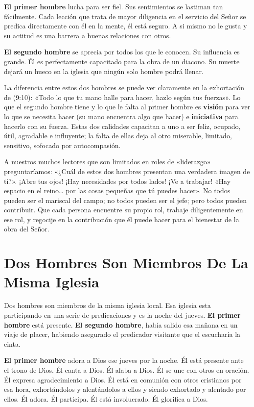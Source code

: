 \documentclass[12pt, twoside, openright]{book}
\begin{document}
\textbf{El primer hombre} lucha para ser fiel. Sus sentimientos se lastiman tan fácilmente. Cada lección que trata de mayor diligencia en el servicio del Señor se predica directamente con él en la mente, él está seguro. A si mismo no le gusta y su actitud es una barrera a buenas relaciones con otros. 

\textbf{El segundo hombre} se aprecia por todos los que le conocen. Su influencia es grande. Él es perfectamente capacitado para la obra de un diacono. Su muerte dejará un hueco en la iglesia que ningún solo hombre podrá llenar. 

La diferencia entre estos dos hombres se puede ver claramente en la exhortación de (9:10): «Todo lo que tu mano halle para hacer, hazlo según tus fuerzas». Lo que el segundo hombre tiene y lo que le falta al primer hombre es \textbf{visión} para ver lo que se necesita hacer (su mano encuentra algo que hacer) e \textbf{iniciativa} para hacerlo con su fuerza. Estas dos calidades capacitan a uno a ser feliz, ocupado, útil, agradable e influyente; la falta de ellas deja al otro miserable, limitado, sensitivo, sofocado por autocompasión. 

A nuestros muchos lectores que son limitados en roles de «liderazgo» preguntaríamos: «¿Cuál de estos dos hombres presentan una verdadera imagen de ti?». ¡Abre tus ojos! ¡Hay necesidades por todos lados! ¡Ve a trabajar! «Hay espacio en el reino… por las cosas pequeñas que tú puedes hacer». No todos pueden ser el mariscal del campo; no todos pueden ser el jefe; pero todos pueden contribuir. Que cada persona encuentre su propio rol, trabaje diligentemente en ese rol, y regocije en la contribución que él puede hacer para el bienestar de la obra del Señor. 

\section{Dos Hombres Son Miembros De La Misma Iglesia}
Dos hombres son miembros de la misma iglesia local. Esa iglesia esta participando en una serie de predicaciones y es la noche del jueves. \textbf{El primer hombre} está presente. \textbf{El segundo hombre}, había salido esa mañana en un viaje de placer, habiendo asegurado el predicador visitante que el escucharía la cinta. 

\textbf{El primer hombre} adora a Dios ese jueves por la noche. Él está presente ante el trono de Dios. Él canta a Dios. Él alaba a Dios. Él se une con otros en oración. Él expresa agradecimiento a Dios. Él está en comunión con otros cristianos por esa hora, exhortándolos y alentándolos a ellos y siendo exhortado y alentado por ellos. Él adora. Él participa. Él está involucrado. Él glorifica a Dios. 
\end{document}
